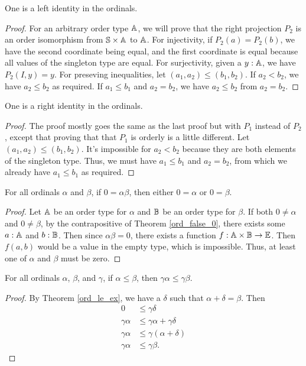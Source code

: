 \documentclass[../../math.tex]{subfiles}
\begin{document}
\begin{instance}
    One is a left identity in the ordinals.
\end{instance}
\begin{proof}
    For an arbitrary order type $\mathbb{A}$, we will prove that the right projection
    $P_2$ is an order isomorphism from $\mathbb{S} \times \mathbb{A}$ to $\mathbb{A}$.  For injectivity,
    if $P_2(a) = P_2(b)$, we have the second coordinate being equal, and the
    first coordinate is equal because all values of the singleton type are
    equal.  For surjectivity, given a $y : \mathbb{A}$, we have $P_2(I, y) = y$.  For
    preseving inequalities,  let $(a_1, a_2) \leq (b_1, b_2)$.  If $a_2 < b_2$,
    we have $a_2 \leq b_2$ as required.  If $a_1 \leq b_1$ and $a_2 = b_2$, we
    have $a_2 \leq b_2$ from $a_2 = b_2$.
\end{proof}

\begin{instance}
    One is a right identity in the ordinals.
\end{instance}
\begin{proof}
    The proof mostly goes the same as the last proof but with $P_1$ instead of
    $P_2$, except that proving that that $P_1$ is orderly is a little different.
    Let $(a_1, a_2) \leq (b_1, b_2)$.  It's impossible for $a_2 < b_2$ because
    they are both elements of the singleton type.  Thus, we must have $a_1 \leq
    b_1$ and $a_2 = b_2$, from which we already have $a_1 \leq b_1$ as required.
\end{proof}

\begin{theorem} \label{ord_mult_zero}
    For all ordinals $\alpha$ and $\beta$, if $0 = \alpha \beta$, then either $0
    = \alpha$ or $0 = \beta$.
\end{theorem}
\begin{proof}
    Let $\mathbb{A}$ be an order type for $\alpha$ and $\mathbb{B}$ be an order type for
    $\beta$.  If both $0 \neq \alpha$ and $0 \neq \beta$, by the contrapositive
    of Theorem \ref{ord_false_0}, there exists some $a : \mathbb{A}$ and $b : \mathbb{B}$.  Then
    since $\alpha\beta = 0$, there exists a function $f : \mathbb{A} \times \mathbb{B} \to \mathbb{E}$.
    Then $f(a, b)$ would be a value in the empty type, which is impossible.
    Thus, at least one of $\alpha$ and $\beta$ must be zero.
\end{proof}

\begin{theorem} \label{ord_le_lmult}
    For all ordinals $\alpha$, $\beta$, and $\gamma$, if $\alpha \leq \beta$,
    then $\gamma \alpha \leq \gamma \beta$.
\end{theorem}
\begin{proof}
    By Theorem \ref{ord_le_ex}, we have a $\delta$ such that $\alpha + \delta =
    \beta$.  Then
    \begin{align*}
        0 &\leq \gamma \delta \\
        \gamma \alpha &\leq \gamma \alpha + \gamma \delta \\
        \gamma \alpha &\leq \gamma (\alpha + \delta) \\
        \gamma \alpha &\leq \gamma \beta.
    \end{align*}
\end{proof}
\end{document}
